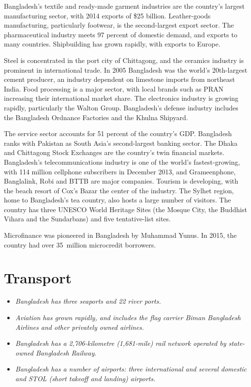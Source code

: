 Bangladesh's textile and ready-made garment industries are the country's
largest manufacturing sector, with 2014 exports of \$25 billion.
Leather-goods manufacturing, particularly footwear, is the
second-largest export sector. The pharmaceutical industry meets 97
percent of domestic demand, and exports to many countries. Shipbuilding
has grown rapidly, with exports to Europe.

Steel is concentrated in the port city of Chittagong, and the ceramics
industry is prominent in international trade. In 2005 Bangladesh was the
world's 20th-largest cement producer, an industry dependent on limestone
imports from northeast India. Food processing is a major sector, with
local brands such as PRAN increasing their international market share.
The electronics industry is growing rapidly, particularly the Walton
Group. Bangladesh's defense industry includes the Bangladesh Ordnance
Factories and the Khulna Shipyard.

The service sector accounts for 51 percent of the country's GDP.
Bangladesh ranks with Pakistan as South Asia's second-largest banking
sector. The Dhaka and Chittagong Stock Exchanges are the country's twin
financial markets. Bangladesh's telecommunications industry is one of
the world's fastest-growing, with 114 million cellphone subscribers in
December 2013, and Grameenphone, Banglalink, Robi and BTTB are major
companies. Tourism is developing, with the beach resort of Cox's Bazar
the center of the industry. The Sylhet region, home to Bangladesh's tea
country, also hosts a large number of visitors. The country has three
UNESCO World Heritage Sites (the Mosque City, the Buddhist Vihara and
the Sundarbans) and five tentative-list sites.

Microfinance was pioneered in Bangladesh by Muhammad Yunus. In 2015, the
country had over 35~million microcredit borrowers.

\section{Transport}\label{transport}

\begin{itemize}
\item
  \emph{Bangladesh has three seaports and 22 river ports.}
\item
  \emph{Aviation has grown rapidly, and includes the flag carrier Biman
  Bangladesh Airlines and other privately owned airlines.}
\item
  \emph{Bangladesh has a 2,706-kilometre (1,681-mile) rail network
  operated by state-owned Bangladesh Railway.}
\item
  \emph{Bangladesh has a number of airports: three international and
  several domestic and STOL (short takeoff and landing) airports.}
\end{itemize}

